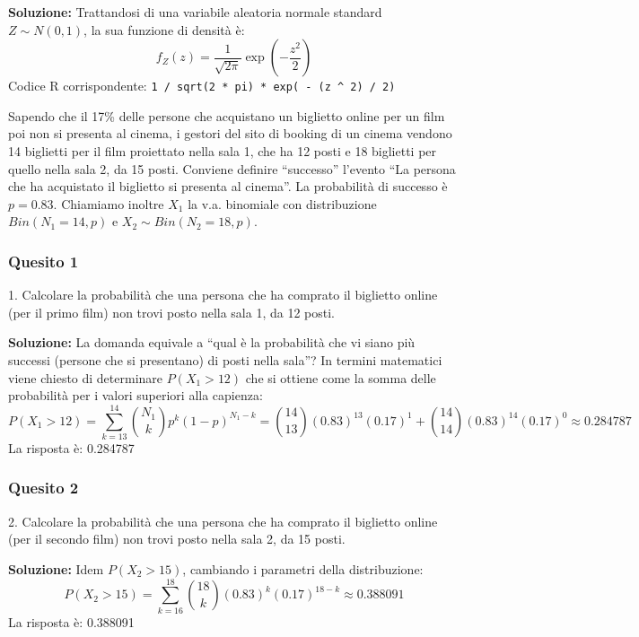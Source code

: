 \documentclass[12pt, a4paper]{article}
\begin{document}
\textbf{Soluzione:}
Trattandosi di una variabile aleatoria normale standard $Z \sim N(0,1)$, la sua funzione di densità è:
$$ f_Z(z) = \frac{1}{\sqrt{2\pi}} \exp\left(-\frac{z^2}{2}\right) $$
Codice R corrispondente: \texttt{1 / sqrt(2 * pi) * exp( - (z \textasciicircum{} 2) / 2)}


\vspace{0.5cm}
\begin{tcolorbox}[colback=lightergray!10, colframe=tocsec, title=\textbf{Esercizio 2}]
Sapendo che il 17\% delle persone che acquistano un biglietto online per un film poi non si presenta al cinema, i gestori del sito di booking di un cinema vendono 14 biglietti per il film proiettato nella sala 1, che ha 12 posti e 18 biglietti per quello nella sala 2, da 15 posti.
Conviene definire ``successo'' l’evento ``La persona che ha acquistato il biglietto si presenta al cinema''. La probabilità di successo è $p=0.83$. Chiamiamo inoltre $X_1$ la v.a. binomiale con distribuzione $Bin(N_1=14,p)$ e $X_2 \sim Bin(N_2=18,p)$.
\end{tcolorbox}

\subsubsection*{Quesito 1}
1. Calcolare la probabilità che una persona che ha comprato il biglietto online (per il primo film) non trovi posto nella sala 1, da 12 posti.

\textbf{Soluzione:}
La domanda equivale a ``qual è la probabilità che vi siano più successi (persone che si presentano) di posti nella sala''? In termini matematici viene chiesto di determinare $P(X_1 > 12)$ che si ottiene come la somma delle probabilità per i valori superiori alla capienza:
$$ P(X_1 > 12) = \sum_{k=13}^{14} \binom{N_1}{k} p^k (1-p)^{N_1-k} = \binom{14}{13}(0.83)^{13}(0.17)^1 + \binom{14}{14}(0.83)^{14}(0.17)^0 \approx 0.284787 $$
La risposta è: 0.284787

\subsubsection*{Quesito 2}
2. Calcolare la probabilità che una persona che ha comprato il biglietto online (per il secondo film) non trovi posto nella sala 2, da 15 posti.

\textbf{Soluzione:}
Idem $P(X_2 > 15)$, cambiando i parametri della distribuzione:
$$ P(X_2 > 15) = \sum_{k=16}^{18} \binom{18}{k} (0.83)^k (0.17)^{18-k} \approx 0.388091 $$
La risposta è: 0.388091
\end{document}
